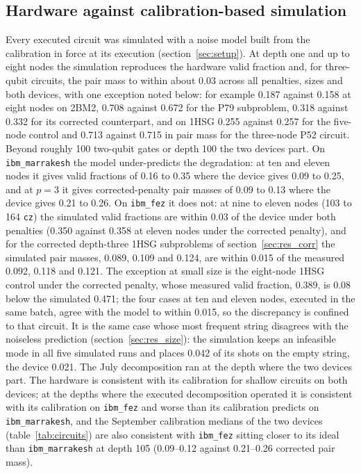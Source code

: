 \documentclass{iopjournal}
\begin{document}
\subsection{Hardware against calibration-based simulation}
\label{sec:res_noise}
Every executed circuit was simulated with a noise model built from the calibration in force at its execution (section~\ref{sec:setup}). At depth one and up to eight nodes the simulation reproduces the hardware valid fraction and, for three-qubit circuits, the pair mass to within about 0.03 across all penalties, sizes and both devices, with one exception noted below: for example 0.187 against 0.158 at eight nodes on 2BM2, 0.708 against 0.672 for the P79 subproblem, 0.318 against 0.332 for its corrected counterpart, and on 1HSG 0.255 against 0.257 for the five-node control and 0.713 against 0.715 in pair mass for the three-node P52 circuit. Beyond roughly 100 two-qubit gates or depth 100 the two devices part. On \texttt{ibm\_marrakesh} the model under-predicts the degradation: at ten and eleven nodes it gives valid fractions of 0.16 to 0.35 where the device gives 0.09 to 0.25, and at $p=3$ it gives corrected-penalty pair masses of 0.09 to 0.13 where the device gives 0.21 to 0.26. On \texttt{ibm\_fez} it does not: at nine to eleven nodes (103 to 164 \texttt{cz}) the simulated valid fractions are within 0.03 of the device under both penalties (0.350 against 0.358 at eleven nodes under the corrected penalty), and for the corrected depth-three 1HSG subproblems of section~\ref{sec:res_corr} the simulated pair masses, 0.089, 0.109 and 0.124, are within 0.015 of the measured 0.092, 0.118 and 0.121. The exception at small size is the eight-node 1HSG control under the corrected penalty, whose measured valid fraction, 0.389, is 0.08 below the simulated 0.471; the four cases at ten and eleven nodes, executed in the same batch, agree with the model to within 0.015, so the discrepancy is confined to that circuit. It is the same case whose most frequent string disagrees with the noiseless prediction (section~\ref{sec:res_size}): the simulation keeps an infeasible mode in all five simulated runs and places 0.042 of its shots on the empty string, the device 0.021. The July decomposition ran at the depth where the two devices part. The hardware is consistent with its calibration for shallow circuits on both devices; at the depths where the executed decomposition operated it is consistent with its calibration on \texttt{ibm\_fez} and worse than its calibration predicts on \texttt{ibm\_marrakesh}, and the September calibration medians of the two devices (table~\ref{tab:circuits}) are also consistent with \texttt{ibm\_fez} sitting closer to its ideal than \texttt{ibm\_marrakesh} at depth 105 (0.09--0.12 against 0.21--0.26 corrected pair mass).
\end{document}
